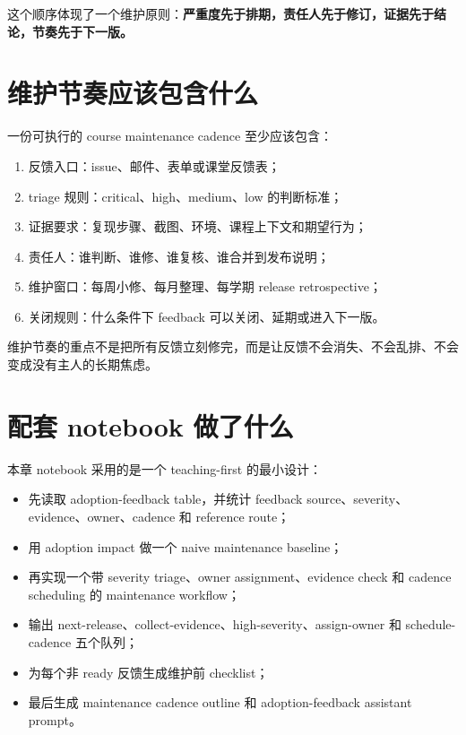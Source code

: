 这个顺序体现了一个维护原则：\textbf{严重度先于排期，责任人先于修订，证据先于结论，节奏先于下一版。}

\section{维护节奏应该包含什么}

一份可执行的 course maintenance cadence 至少应该包含：

\begin{enumerate}
    \item 反馈入口：issue、邮件、表单或课堂反馈表；
    \item triage 规则：critical、high、medium、low 的判断标准；
    \item 证据要求：复现步骤、截图、环境、课程上下文和期望行为；
    \item 责任人：谁判断、谁修、谁复核、谁合并到发布说明；
    \item 维护窗口：每周小修、每月整理、每学期 release retrospective；
    \item 关闭规则：什么条件下 feedback 可以关闭、延期或进入下一版。
\end{enumerate}

维护节奏的重点不是把所有反馈立刻修完，而是让反馈不会消失、不会乱排、不会变成没有主人的长期焦虑。

\section{配套 notebook 做了什么}

本章 notebook 采用的是一个 teaching-first 的最小设计：

\begin{itemize}
    \item 先读取 adoption-feedback table，并统计 feedback source、severity、evidence、owner、cadence 和 reference route；
    \item 用 adoption impact 做一个 naive maintenance baseline；
    \item 再实现一个带 severity triage、owner assignment、evidence check 和 cadence scheduling 的 maintenance workflow；
    \item 输出 next-release、collect-evidence、high-severity、assign-owner 和 schedule-cadence 五个队列；
    \item 为每个非 ready 反馈生成维护前 checklist；
    \item 最后生成 maintenance cadence outline 和 adoption-feedback assistant prompt。
\end{itemize}

